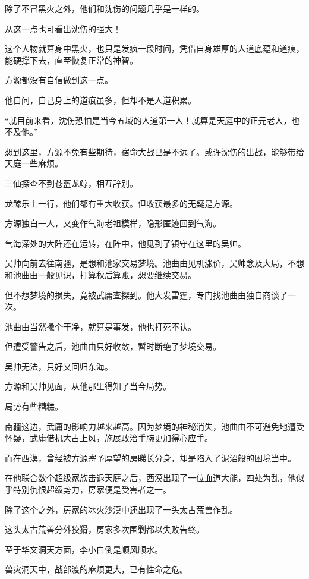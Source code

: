 \begin{this_body}
除了不冒黑火之外，他们和沈伤的问题几乎是一样的。

从这一点也可看出沈伤的强大！

这个人物就算身中黑火，也只是发疯一段时间，凭借自身雄厚的人道底蕴和道痕，能硬撑下去，直至恢复正常的神智。

方源都没有自信做到这一点。

他自问，自己身上的道痕虽多，但却不是人道积累。

“就目前来看，沈伤恐怕是当今五域的人道第一人！就算是天庭中的正元老人，也不及他。”

想到这里，方源不免有些期待，宿命大战已是不远了。或许沈伤的出战，能够带给天庭一些麻烦。

三仙探查不到苍蓝龙鲸，相互辞别。

龙鲸乐土一行，他们都有重大收获。但收获最多的无疑是方源。

方源独自一人，又变作气海老祖模样，隐形匿迹回到气海。

气海深处的大阵还在运转，在阵中，他见到了镇守在这里的吴帅。

吴帅向前去往南疆，是想和池家交易梦境。池曲由见机涨价，吴帅念及大局，不想和池曲由一般见识，打算秋后算账，想要继续交易。

但不想梦境的损失，竟被武庸查探到。他大发雷霆，专门找池曲由独自商谈了一次。

池曲由当然撇个干净，就算是事发，他也打死不认。

但遭受警告之后，池曲由只好收敛，暂时断绝了梦境交易。

吴帅无法，只好又回归东海。

方源和吴帅见面，从他那里得知了当今局势。

局势有些糟糕。

南疆这边，武庸的影响力越来越高。因为梦境的神秘消失，池曲由不可避免地遭受怀疑，武庸借机大占上风，施展政治手腕更加得心应手。

而在西漠，曾经被方源寄予厚望的房睇长分身，却是陷入了泥沼般的困境当中。

在他联合数个超级家族击退天庭之后，西漠出现了一位血道大能，四处为乱，他似乎特别仇恨超级势力，房家便是受害者之一。

除了这个之外，房家的冰火沙漠中还出现了一头太古荒兽作乱。

这头太古荒兽分外狡猾，房家多次围剿都以失败告终。

至于华文洞天方面，李小白倒是顺风顺水。

兽灾洞天中，战部渡的麻烦更大，已有性命之危。

\end{this_body}

